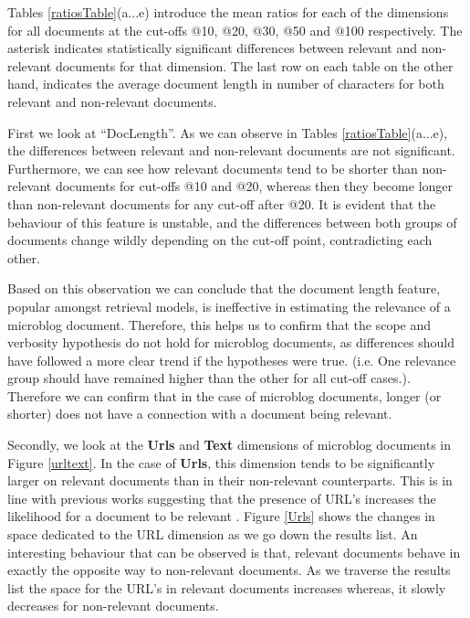 


Tables \ref{ratiosTable}(a...e) introduce the mean ratios for each of the dimensions for all documents at the cut-offs @10, @20, @30, @50 and @100 respectively. The asterisk indicates statistically significant differences between relevant and non-relevant documents for that dimension. The last row on each table on the other hand, indicates the average document length in number of characters for both relevant and non-relevant documents.

First we look at ``DocLength''. As we can observe in Tables \ref{ratiosTable}(a...e), the differences between relevant and non-relevant documents are not significant. Furthermore, we can see how relevant documents tend to be shorter than non-relevant documents for cut-offs @10 and @20, whereas then they become longer than non-relevant documents for any cut-off after @20. It is evident that the behaviour of this feature is unstable, and the differences between both groups of documents change wildly depending on the cut-off point, contradicting each other.

Based on this observation we can conclude that the document length feature, popular amongst retrieval models, is ineffective in estimating the relevance of a microblog document. Therefore, this helps us to confirm that the scope and verbosity hypothesis do not hold for microblog documents, as differences should have followed a more clear trend if the hypotheses were true. (i.e. One relevance group should have remained higher than the other for all cut-off cases.). Therefore we can confirm that in the case of microblog documents, longer (or shorter) does not have a connection with a document being relevant. 

Secondly, we look at the \textbf{Urls} and \textbf{Text} dimensions of microblog documents in Figure \ref{urltext}. In the case of \textbf{Urls}, this dimension tends to be significantly larger on relevant documents than in their non-relevant counterparts. This is in line with previous works suggesting that the presence of URL's increases the likelihood for a document to be relevant \cite{massoudi2011incorporating}. Figure \ref{Urls} shows the changes in space dedicated to the URL dimension as we go down the results list. An interesting behaviour that can be observed is that, relevant documents behave in exactly the opposite way to non-relevant documents. As we traverse the results list the space for the URL's in relevant documents increases whereas, it slowly decreases for non-relevant documents.


